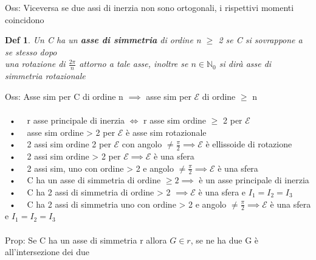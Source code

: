 \documentclass{article}
\theoremstyle{unnumbered}
\newtheorem* {theoremT}{Def}
\theoremstyle{unnumbered1}
\newenvironment{defi}{\begin{gBox}\begin{theoremT}}{\end{theoremT}\end{gBox}}
\begin{document}
Oss: Viceversa se due assi di inerzia non sono ortogonali, i rispettivi momenti coincidono\\
%
%
%
\begin{defi}
Un C ha un \textbf{asse di simmetria} di ordine n $\ge$ 2 se C si sovrappone a se stesso dopo \\ 
\phantom{DEF. } una rotazione di $\frac{2\pi}{n}$ attorno a tale asse, inoltre se $n\in\mathbb{N}_0$ si dirà asse di simmetria rotazionale
\end{defi}
%
Oss: Asse sim per C di ordine n $\implies$ asse sim per $\mathcal{E}$ di ordine $\ge$ n \\ \\
%
%
%
\ • \ \ r asse principale di inerzia $\Leftrightarrow$ r asse sim ordine $\ge$ 2 per $\mathcal{E}$ \\
\ • \ \ asse sim ordine > 2 per $\mathcal{E}$ è asse sim rotazionale \\
\ • \ \ 2 assi sim ordine 2 per $\mathcal{E}$ con angolo $\neq \frac{\pi}{2} \implies \mathcal{E}$ è ellissoide di rotazione \\
\ • \ \ 2 assi sim ordine > 2 per $\mathcal{E} \implies \mathcal{E}$ è una sfera \\
\ • \ \ 2 assi sim, uno con ordine > 2 e angolo $\neq \frac{\pi}{2} \implies \mathcal{E}$ è una sfera \\
%
%
%
\ • \ \ C ha un asse di simmetria di ordine $\ge 2 \implies$ è un asse principale di inerzia \\
\ • \ \ C ha 2 assi di simmetria di ordine > 2 $\implies \mathcal{E}$ è una sfera e $I_1=I_2=I_3$ \\
\ • \ \ C ha 2 assi di simmetria uno con ordine > 2 e angolo $\neq \frac{\pi}{2} \implies  \mathcal{E}$ è una sfera e $I_1=I_2=I_3$ \\ \\
%
%
%
Prop: Se C ha un asse di simmetria r allora $G \in r$, se ne ha due G è all'intersezione dei due
\end{document}
